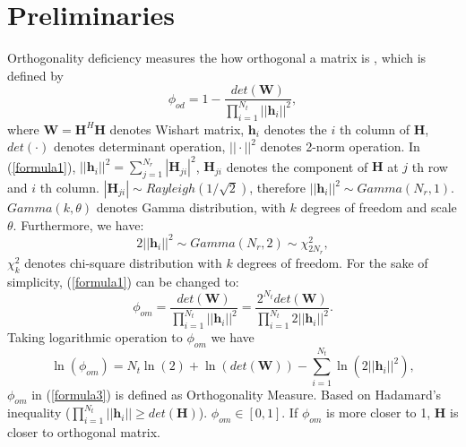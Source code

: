 \documentclass[12pt, draftclsnofoot, onecolumn]{IEEEtran}
\begin{document}
\section{Preliminaries}\label{preliminary}
Orthogonality deficiency measures the how orthogonal a matrix is \cite{ma2008performance}, which is defined by
\begin{equation}
\phi_{od}=1-\frac{det(\mathbf{W})}{\prod_{i=1}^{N_{t}}||\mathbf{h}_{i}||^{2}},
\label{formula1}
\end{equation}
where $\mathbf{W}=\mathbf{H}^{H}\mathbf{H}$ denotes Wishart matrix, $\mathbf{h}_{i}$ denotes the $i$ th column of $\mathbf{H}$, $det(\cdot)$ denotes determinant operation, $||\cdot||^{2}$ denotes 2-norm operation.
In (\ref{formula1}), $||\mathbf{h}_{i}||^{2}=\sum_{j=1}^{N_{r}}|\mathbf{H}_{ji}|^{2}$, $\mathbf{H}_{ji}$ denotes the component of $\mathbf{H}$ at $j$ th row and $i$ th column. $|\mathbf{H}_{ji}|\sim Rayleigh(1/\sqrt{2})$, therefore $||\mathbf{h}_{i}||^{2}\sim Gamma(N_{r},1)$\cite{papoulis1996stochastic}. $Gamma(k,\theta)$ denotes Gamma distribution, with $k$ degrees of freedom and scale $\theta$. Furthermore, we have:
\begin{equation}
2||\mathbf{h}_{i}||^{2}\sim Gamma(N_{r},2)\sim\chi^{2}_{2N_{r}},
\label{formula2}
\end{equation} 
$\chi^{2}_{k}$ denotes chi-square distribution with $k$ degrees of freedom. For the sake of simplicity, (\ref{formula1}) can be changed to:
\begin{equation}
\phi_{om}=\frac{det(\mathbf{W})}{\prod_{i=1}^{N_{t}}||\mathbf{h}_{i}||^{2}}=\frac{2^{N_{t}}det(\mathbf{W})}{\prod_{i=1}^{N_{t}}2||\mathbf{h}_{i}||^{2}}.
\label{formula3}
\end{equation}
Taking logarithmic operation to $\phi_{om}$ we have 
\begin{equation}
\ln(\phi_{om})=N_{t}\ln(2)+\ln(det(\mathbf{W}))-\sum_{i=1}^{N_{t}}\ln(2||\mathbf{h}_{i}||^{2}),
\label{formula4}
\end{equation}
$\phi_{om}$ in (\ref{formula3}) is defined as Orthogonality Measure. Based on Hadamard's inequality ($\prod_{i=1}^{N_{t}}||\mathbf{h}_{i}||\geq det(\mathbf{H})$). $\phi_{om}\in [0,1]$. If $\phi_{om}$ is more closer to 1, $\mathbf{H}$ is closer to orthogonal matrix.
\end{document}
